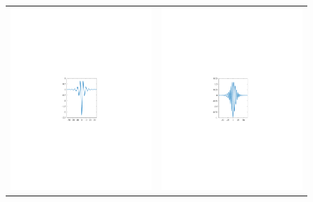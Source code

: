 \documentclass[review,onefignum,onetabnum]{siamart171218}
\begin{document}
\begin{figure}[ht]
\centering
\begin{tabular}{cc}
\includegraphics{single1354}&
\includegraphics{single14}

\end{tabular}
\end{figure}
\end{document}
